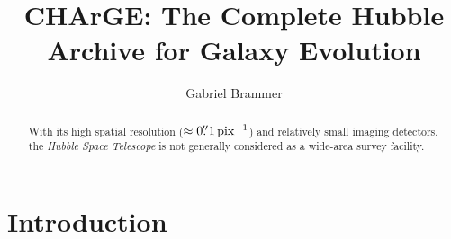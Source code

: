 \documentclass[twocolumn]{aastex63}
\begin{document}
\title{CHArGE: The Complete Hubble Archive for Galaxy Evolution}



\author[0000-0003-2680-005X]{Gabriel Brammer}

\begin{abstract}


With its high spatial resolution ($\approx 0\mbox{$.\!\!^{\prime\prime}$}1\,\mathrm{pix}^{-1}$) and relatively small imaging detectors, the \textit{Hubble Space Telescope} is not generally considered as a wide-area survey facility.

\end{abstract}


\section{Introduction}
\label{s:introduction}

\lipsum[1-4]
\end{document}
